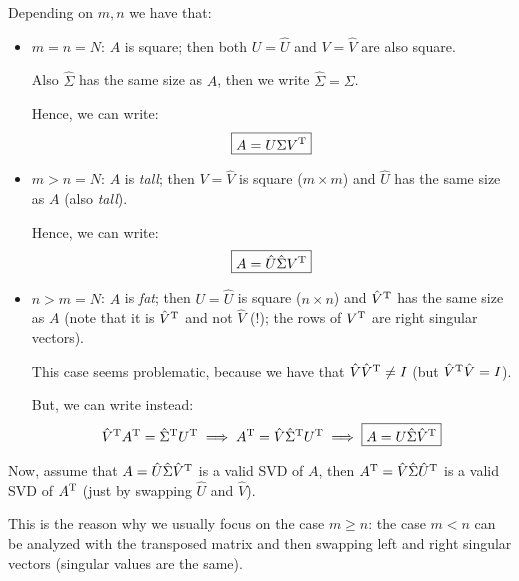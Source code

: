 \documentclass[
  12pt,
  paper=a4,
]{scrartcl} %
\begin{document}
Depending on $m,n$ we have that:
\begin{itemize}
    \item $m=n=N$: $A$ is square; then both $U=\hat{U}$ and $V=\hat{V}$ are also square.
    
    Also $\hat\Sigma$ has the same size as $A$, then we write $\hat\Sigma=\Sigma$.
    
    Hence, we can write: \[\boxed{A=U\Sigma V^{\mathrm{T}}}\]
    \item $m>n=N$: $A$ is \emph{tall}; then $V=\hat V$ is square ($m\times m$) and $\hat U$ has the same size as $A$ (also \emph{tall}).
    
    
    Hence, we can write: \[\boxed{A=\hat U\hat\Sigma V^{\mathrm{T}}}\]
    \item $n>m=N$: $A$ is \emph{fat}; then $U=\hat U$ is square ($n\times n$) and $\hat V^{\mathrm{T}}$ has the same size as $A$ (note that it is $\hat V^{\mathrm{T}}$ and not $\hat V$ (!); the rows of $V^{\mathrm{T}}$ are right singular vectors).
    
    This case seems problematic, because we have that $\hat{V}\hat{V}^{\mathrm{T}}\neq I$ (but $\hat{V}^{\mathrm{T}}\hat{V}=I$).
    
    But, we can write instead: \[
         \hat{V}^{\mathrm{T}} A^{\mathrm{T}}=\hat\Sigma^{\mathrm{T}} U^{\mathrm{T}}
         \implies
         A^{\mathrm{T}}=\hat V\hat\Sigma^{\mathrm{T}} U^{\mathrm{T}}
         \implies
         \boxed{A= U\hat\Sigma \hat V^{\mathrm{T}}}
    \]
\end{itemize}

Now, assume that $A=\hat U\hat\Sigma \hat V^{\mathrm{T}}$ is a valid SVD of $A$, then $A^{\mathrm{T}} = \hat V\hat\Sigma \hat U^{\mathrm{T}}$ is a valid SVD of $A^{\mathrm{T}}$ (just by swapping $\hat U$ and $\hat V$).

This is the reason why we usually focus on the case $m\ge n$: the case $m < n$ can be analyzed with the transposed matrix and then swapping left and right singular vectors (singular values are the same).
\end{document}
